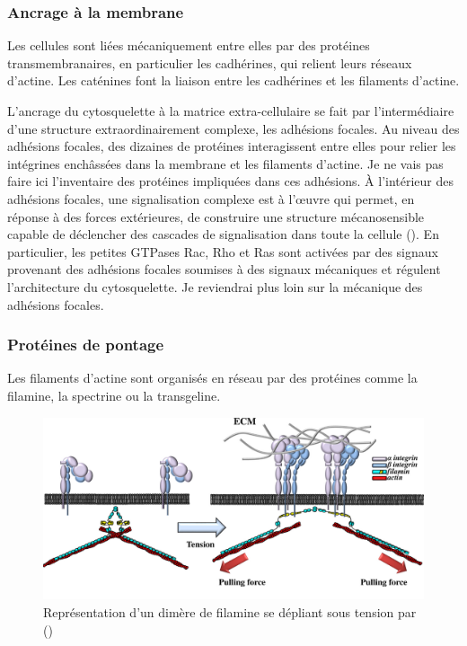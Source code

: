 \subsubsection{Ancrage à la membrane}

Les cellules sont liées mécaniquement entre elles par des protéines transmembranaires, en particulier les cadhérines, qui relient leurs réseaux d'actine. Les caténines font la liaison entre les cadhérines et les filaments d'actine. 

L'ancrage du cytosquelette à la matrice extra-cellulaire se fait par l'intermédiaire d'une structure extraordinairement complexe, les adhésions focales. 
Au niveau des adhésions focales, des dizaines de protéines interagissent entre elles pour relier les intégrines enchâssées dans la membrane et les filaments d'actine. 
Je ne vais pas faire ici l'inventaire des protéines impliquées dans ces adhésions. 
À l'intérieur des adhésions focales, une signalisation complexe est à l'\oe uvre qui permet, en réponse à des forces extérieures, de construire une structure mécanosensible capable de déclencher des cascades de signalisation dans toute la cellule (\cite{geiger_environmental_2009}). 
En particulier, les petites GTPases Rac, Rho et Ras sont activées par des signaux provenant des adhésions focales soumises à des signaux mécaniques et régulent l'architecture du cytosquelette.
Je reviendrai plus loin sur la mécanique des adhésions focales.  

\subsubsection{Protéines de pontage}

Les filaments d'actine sont organisés en réseau par des protéines comme la filamine, la spectrine ou la transgeline. 

\begin{figure}
\includegraphics[scale=0.25]{Figures/filamine.png} 
\caption{Représentation d'un dimère de filamine se dépliant sous tension par (\cite{janostiak_mechanosensors_2014}) \label{filamine}}
\end{figure}

